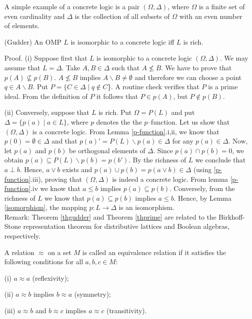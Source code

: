 A simple example of a concrete logic is a pair $(\Omega, \Delta)$,
where $\Omega$ is a finite set of even cardinality and $\Delta$  is the
collection of all subsets of $\Omega$ with an even number of elements.

\begin{theorem}
\label{thgudder}
(Gudder)
An OMP $L$ is isomorphic to a concrete logic iff $L$ is rich.
\end{theorem}

Proof.
(i) Suppose first that $L$ is isomorphic to a concrete logic
$(\Omega, \Delta)$.
We may assume that $L = \Delta$.
Take $A,B \in \Delta$ such that $A \not\le B$.
We have to prove that $p(A) \not\subseteq p(B)$.
$A \not\le B$ implies $A \backslash B \neq \emptyset$ and therefore
we can choose a point $q \in A\backslash B$.
Put $P = \{C \in \Delta \mid q \not\in C$\}.
A routine check verifies that $P$ is a prime ideal.
From the definition of $P$ it follows that $P \in p(A)$,
but $P \not\in p(B)$.

(ii) Conversely, suppose that $L$ is rich.
Put $\Omega = P(L)$ and put $\Delta = \{p(a)\mid a \in L\}$, where $p$ denotes the
the $p$--function.
Let us show that $(\Omega,\Delta)$ is a concrete logic.
From Lemma \ref{p-function}.i,ii, we know that
$p(0) = \emptyset \in \Delta$ and that
$p(a)' = P(L)\backslash p(a) \in \Delta$ for any $p(a) \in \Delta$.
Now, let $p(a)$ and $p(b)$ be orthogonal elements of $\Delta$.
Since $p(a) \cap p(b) = 0$, we obtain $p(a) \subseteq P(L) \backslash
p(b) = p(b')$.
By the richness of $L$ we conclude that $a \perp b$.
Hence, $a \vee b$ exists and $p(a) \cup p(b) = p(a \vee b) \in \Delta$
(using \ref{p-function}.iii), proving that $(\Omega,\Delta)$ is
indeed a concrete logic.
From lemma \ref{p-function}.iv we know that $a \le b$
implies $p(a) \subseteq p(b)$.
Conversely, from the
richness of $L$ we know that $p(a) \subseteq p(b)$ implies $a\le b$.
Hence, by Lemma \ref{isomorphism}, the mapping $p:L \rightarrow \Delta$
is an isomorphism.\\

Remark: Theorem \ref{thgudder} and Theorem \ref{thprime} are related to
the Birkhoff-Stone representation theorem for distributive lattices
and Boolean algebras, respectively.

\begin{defin}
A relation $\approx$ on a set $M$ is called an equivalence relation if it
satisfies the following conditions for all $a,b,c \in M$:

(i) $a \approx a$ (reflexivity);

(ii) $a \approx b$ implies $b \approx a$ (symmetry);

(iii) $a \approx b$ and $b \approx c$ implies $a \approx c$ (transitivity).
\end{defin}

